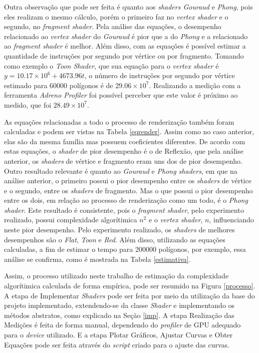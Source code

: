 	Outra observação que pode ser feita é quanto aos \textit{shaders Gouraud} e \textit{Phong}, pois eles realizam o mesmo cálculo, porém o primeiro faz no \textit{vertex shader} e o segundo, no \textit{fragment shader}. Pela análise das equações, o desempenho relacionado ao \textit{vertex shader} do \textit{Gouraud} é pior que a do \textit{Phong} e a relacionado ao \textit{fragment shader} é melhor.  Além disso, com as equações é possível estimar a quantidade de instruções por segundo por vértice ou por fragmento. Tomando como exemplo o \textit{Toon Shader}, que sua equação para o \textit{vertex shader} é  $y = 10.17 \times 10^6 + 4673.96t$, o número de instruções por segundo por vértice estimado para 60000 polígonos é de $29.06 \times 10^7$. Realizando a medição com a ferramenta \textit{Adreno Profiler} foi possível perceber que este valor é próximo ao medido, que foi $28.49 \times 10^7$.

	As equações relacionadas a todo o processo de renderização também foram calculadas e podem ser vistas na Tabela \ref{eqrender}. Assim como no caso anterior, elas são da mesma família mas possuem coeficientes diferentes. De acordo com estas equações, o \textit{shader} de pior desempenho é o de Reflexão, que pela análise anterior, os \textit{shaders} de vértice e fragmento eram uns dos de pior desempenho. Outro resultado relevante é quanto ao \textit{Gouraud} e \textit{Phong shaders}, em que na análise anterior, o primeiro possui o pior desempenho entre os \textit{shaders} de vértice e o segundo, entre os \textit{shaders} de fragmento.  Mas o que possui o pior desempenho entre os dois, em relação ao processo de renderização como um todo, é o \textit{Phong shader}. Este resultado é consistente, pois o \textit{fragment shader}, pelo experimento realizado, possui complexidade algorítimica $n^2$ e o \textit{vertex shader}, $n$, influenciando neste pior desempenho. 	Pelo experimento realizado, os \textit{shaders} de melhores desempenhos são o \textit{Flat}, \textit{Toon} e \textit{Red}. Além disso, utilizando as equações calculadas, a fim de estimar o tempo para 200000 polígonos, por exemplo, essa análise se confirma, como é mostrada na Tabela \ref{estimativa}.
	
	Assim, o processo utilizado neste trabalho de estimação da complexidade algorítimica calculada de forma empírica, pode ser resumido na Figura \ref{processo}. A etapa de Implementar \textit{Shaders} pode ser feita por meio da utilização da base do projeto implementado, extendendo-se da classe \textit{Shader} e implementando os métodos abstratos, como explicado na Seção \ref{imp}. A etapa Realização das Medições é feita de forma manual, dependendo do \textit{profiler} de GPU adequado para o \textit{device} utilizado. E a etapa Plotar Gráficos, Ajustar Curvas e Obter Equações pode ser feita através do \textit{script} criado para o ajuste das curvas.


